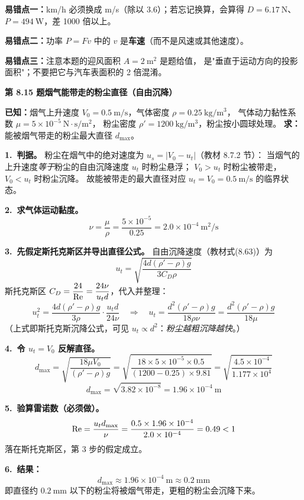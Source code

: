 \begin{yicuo}
\textbf{易错点一：}km/h 必须换成 m/s（除以 3.6）；若忘记换算，会算得 $D=6.17\ \mathrm{N}$、
$P=494\ \mathrm{W}$，差 1000 倍以上。

\textbf{易错点二：}功率 $P=Fv$ 中的 $v$ 是\textbf{车速}（而不是风速或其他速度）。

\textbf{易错点三：}注意本题的迎风面积 $A=2\ \mathrm{m^2}$ 是题给值，
是"垂直于运动方向的投影面积"；不要把它与汽车表面积的 2 倍混淆。
\end{yicuo}

\noindent\textbf{第 8.15 题\quad 烟气能带走的粉尘直径（自由沉降）}

\begin{jie}
\textbf{已知：}烟气上升速度 $V_0=0.5\ \mathrm{m/s}$，气体密度 $\rho=0.25\ \mathrm{kg/m^3}$，
气体动力黏性系数 $\mu=5\times10^{-5}\ \mathrm{N\cdot s/m^2}$，
粉尘密度 $\rho'=1200\ \mathrm{kg/m^3}$，粉尘按小圆球处理。
\textbf{求：}能被烟气带走的粉尘最大直径 $d_{\max}$。

\textbf{1.\ 判据。}
粉尘在烟气中的绝对速度为 $u_s=|V_0-u_t|$（教材 8.7.2 节）：
当烟气的上升速度\emph{等于}粉尘的自由沉降速度 $u_t$ 时粉尘悬浮；
$V_0>u_t$ 时粉尘被带走，$V_0<u_t$ 时粉尘沉降。
故能被带走的最大直径对应 $u_t=V_0=0.5\ \mathrm{m/s}$ 的临界状态。

\textbf{2.\ 求气体运动黏度。}
\[
\nu=\frac{\mu}{\rho}=\frac{5\times10^{-5}}{0.25}=2.0\times10^{-4}\ \mathrm{m^2/s}
\]

\textbf{3.\ 先假定斯托克斯区并导出直径公式。}
自由沉降速度（教材式(8.63)）为
\[
u_t=\sqrt{\frac{4d(\rho'-\rho)g}{3C_D\rho}}
\]
斯托克斯区 $C_D=\dfrac{24}{\mathrm{Re}}=\dfrac{24\nu}{u_t d}$，代入并整理：
\[
u_t^2=\frac{4d(\rho'-\rho)g}{3\rho}\cdot\frac{u_td}{24\nu}
\quad\Longrightarrow\quad
u_t=\frac{d^2(\rho'-\rho)g}{18\rho\nu}=\frac{d^2(\rho'-\rho)g}{18\mu}
\]
（上式即斯托克斯沉降公式，可见 $u_t\propto d^2$：\emph{粉尘越粗沉降越快}。）

\textbf{4.\ 令 $u_t=V_0$ 反解直径。}
\[
d_{\max}=\sqrt{\frac{18\mu V_0}{(\rho'-\rho)g}}
=\sqrt{\frac{18\times5\times10^{-5}\times0.5}{(1200-0.25)\times9.81}}
=\sqrt{\frac{4.5\times10^{-4}}{1.177\times10^4}}
\]
\[
d_{\max}=\sqrt{3.82\times10^{-8}}=1.96\times10^{-4}\ \mathrm{m}
\]

\textbf{5.\ 验算雷诺数（必须做）。}
\[
\mathrm{Re}=\frac{u_t d_{\max}}{\nu}=\frac{0.5\times1.96\times10^{-4}}{2.0\times10^{-4}}=0.49<1
\]
落在斯托克斯区，第 3 步的假定成立。

\textbf{6.\ 结果：}
\[
\boxed{\,d_{\max}\approx1.96\times10^{-4}\ \mathrm{m}\approx0.2\ \mathrm{mm}\,}
\]
即直径约 $0.2\ \mathrm{mm}$ 以下的粉尘将被烟气带走，更粗的粉尘会沉降下来。
\end{jie}

